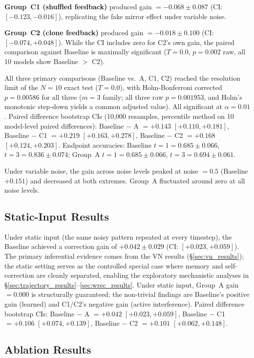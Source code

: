 \documentclass[10pt]{article}
\begin{document}
\textbf{Group~C1 (shuffled feedback)} produced gain $= -0.068 \pm 0.087$ (CI: $[-0.123, -0.016]$), replicating the fake mirror effect under variable noise.

\textbf{Group~C2 (clone feedback)} produced gain $= -0.018 \pm 0.100$ (CI: $[-0.074, +0.048]$). While the CI includes zero for C2's own gain, the paired comparison against Baseline is maximally significant ($T = 0.0$, $p = 0.002$ raw, all 10 models show Baseline $>$ C2).

All three primary comparisons (Baseline vs.\ A, C1, C2) reached the resolution limit of the $N{=}10$ exact test ($T = 0.0$), with Holm-Bonferroni corrected $p = 0.00586$ for all three ($m = 3$ family; all three raw $p = 0.001953$, and Holm's monotonic step-down yields a common adjusted value). All significant at $\alpha = 0.01$. Paired difference bootstrap CIs (10,000 resamples, percentile method on 10 model-level paired differences): Baseline $-$ A $= +0.143$ $[+0.110, +0.181]$, Baseline $-$ C1 $= +0.219$ $[+0.163, +0.278]$, Baseline $-$ C2 $= +0.168$ $[+0.124, +0.203]$. Endpoint accuracies: Baseline $t{=}1 = 0.685 \pm 0.066$, $t{=}3 = 0.836 \pm 0.074$; Group~A $t{=}1 = 0.685 \pm 0.066$, $t{=}3 = 0.694 \pm 0.061$.

Under variable noise, the gain across noise levels peaked at noise $= 0.5$ (Baseline $+0.151$) and decreased at both extremes. Group~A fluctuated around zero at all noise levels.

\subsection{Static-Input Results}

Under static input (the same noisy pattern repeated at every timestep), the Baseline achieved a correction gain of $+0.042 \pm 0.029$ (CI: $[+0.023, +0.059]$). The primary inferential evidence comes from the VN results (\S\ref{sec:vn_results}); the static setting serves as the controlled special case where memory and self-correction are cleanly separated, enabling the exploratory mechanistic analyses in \S\ref{sec:trajectory_results}--\ref{sec:wrec_results}. Under static input, Group~A gain $= 0.000$ is structurally guaranteed; the non-trivial findings are Baseline's positive gain (learned) and C1/C2's negative gain (active interference). Paired difference bootstrap CIs: Baseline $-$ A $= +0.042$ $[+0.023, +0.059]$, Baseline $-$ C1 $= +0.106$ $[+0.074, +0.139]$, Baseline $-$ C2 $= +0.101$ $[+0.062, +0.148]$.

\subsection{Ablation Results}
\end{document}

